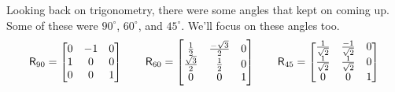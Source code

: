 \documentclass{ximera}
\begin{document}
Looking back on trigonometry, there were some angles that kept on
coming up. Some of these were $90^\circ$, $60^\circ$, and $45^\circ$.
We'll focus on these angles too.
\[
\mathsf{R}_{90} =
\begin{bmatrix}
0 & -1 & 0\\
1 & 0 & 0\\
0 & 0 & 1
\end{bmatrix}
\qquad 
\mathsf{R}_{60} =
\begin{bmatrix}
\frac{1}{2} & \frac{-\sqrt{3}}{2} & 0\\
\frac{\sqrt{3}}{2} & \frac{1}{2} & 0\\
0 & 0 & 1
\end{bmatrix}
\qquad
\mathsf{R}_{45} =
\begin{bmatrix}
\frac{1}{\sqrt{2}} & \frac{-1}{\sqrt{2}} & 0\\
\frac{1}{\sqrt{2}} & \frac{1}{\sqrt{2}} & 0\\
0 & 0 & 1
\end{bmatrix}
\]
\end{document}
